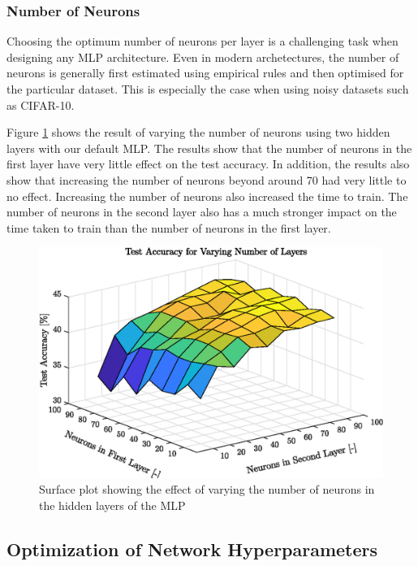 \subsubsection{Number of Neurons}

Choosing the optimum number of neurons per layer is a challenging task when designing any MLP architecture. Even in modern archetectures, the number of neurons is generally first estimated using empirical rules and then optimised for the particular dataset\cite{lawrence1998size}. This is especially the case when using noisy datasets such as CIFAR-10.

Figure \ref{fig:surfaceLayers} shows the result of varying the number of neurons using two hidden layers with our default MLP. The results show that the number of neurons in the first layer have very little effect on the test accuracy. In addition, the results also show that increasing the number of neurons beyond around 70 had very little to no effect. Increasing the number of neurons also increased the time to train. The number of neurons in the second layer also has a much stronger impact on the time taken to train than the number of neurons in the first layer.

	\begin{figure}[h!]
   		 \centering
   		 \includegraphics{images/surfacelayers}
   		 \caption{Surface plot showing the effect of varying the number of neurons in the hidden layers of the MLP}
   		 \label{fig:surfaceLayers}
    \end{figure}

\subsection{Optimization of Network Hyperparameters}\label{subsec:optNet}

